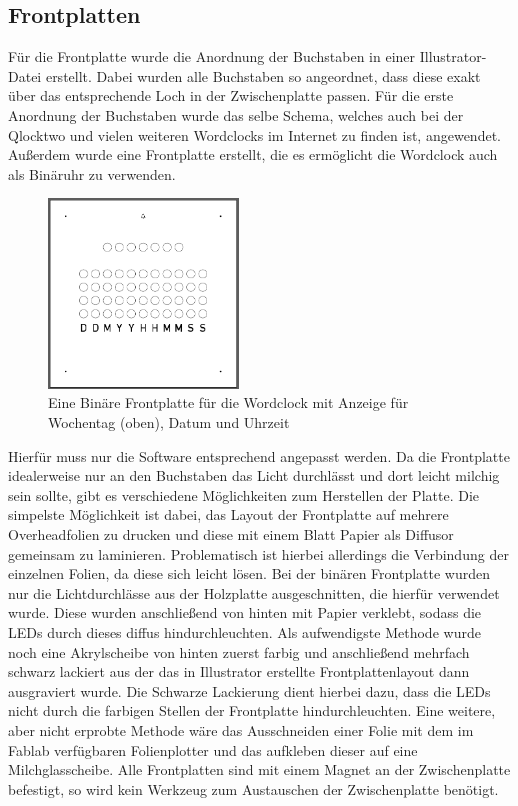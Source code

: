 \documentclass[12pt,journal,compsoc]{IEEEtran}
\begin{document}
\subsection{Frontplatten}
Für die Frontplatte wurde die Anordnung der Buchstaben in einer Illustrator-Datei erstellt. Dabei wurden alle Buchstaben so angeordnet, dass diese exakt über das entsprechende Loch in der Zwischenplatte passen. Für die erste Anordnung der Buchstaben wurde das selbe Schema, welches auch bei der Qlocktwo und vielen weiteren Wordclocks im Internet zu finden ist, angewendet. Außerdem wurde eine Frontplatte erstellt, die es ermöglicht die Wordclock auch als Binäruhr zu verwenden. 
\begin{figure}[h]
	\centering
	\includegraphics[width=0.45\textwidth]{Bilder/Frontplatte2}
	\caption{Eine Binäre Frontplatte für die Wordclock mit Anzeige für Wochentag (oben), Datum und Uhrzeit} 
	\label{fig:Frontplatte2}
\end{figure}
Hierfür muss nur die Software entsprechend angepasst werden. Da die Frontplatte idealerweise  nur an den Buchstaben das Licht durchlässt und dort leicht milchig sein sollte, gibt es  verschiedene Möglichkeiten zum Herstellen der Platte. Die simpelste Möglichkeit ist dabei, das Layout der Frontplatte auf mehrere Overheadfolien zu drucken und diese mit einem Blatt Papier als Diffusor gemeinsam zu laminieren. Problematisch ist hierbei allerdings die Verbindung der einzelnen Folien, da diese sich leicht lösen. Bei der binären Frontplatte wurden nur die Lichtdurchlässe aus der Holzplatte ausgeschnitten, die hierfür verwendet wurde. Diese wurden anschließend von hinten mit Papier verklebt, sodass die LEDs durch dieses diffus hindurchleuchten. Als aufwendigste Methode wurde noch eine Akrylscheibe von hinten zuerst farbig und anschließend mehrfach schwarz lackiert aus der das in Illustrator erstellte Frontplattenlayout dann ausgraviert wurde. Die Schwarze Lackierung dient hierbei dazu, dass die LEDs nicht durch die farbigen Stellen der Frontplatte hindurchleuchten. Eine weitere, aber nicht erprobte Methode wäre das Ausschneiden einer Folie mit dem im Fablab verfügbaren Folienplotter und das aufkleben dieser auf eine Milchglasscheibe. Alle Frontplatten sind mit einem Magnet an der Zwischenplatte befestigt, so wird kein Werkzeug zum Austauschen der Zwischenplatte benötigt.
\end{document}

